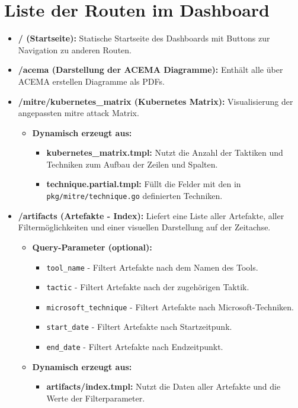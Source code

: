 \chapter{Liste der Routen im Dashboard}
\label{app:routes}
\begin{itemize}
    \item \textbf{/ (Startseite):} Statische Startseite des Dashboards mit Buttons zur Navigation zu anderen Routen.
    \item \textbf{/acema (Darstellung der ACEMA Diagramme):} Enthält alle über ACEMA erstellen Diagramme als PDFs.
    \item \textbf{/mitre/kubernetes\_matrix (Kubernetes Matrix):} Visualisierung der angepassten \gls{mitre} \gls{attack} Matrix.
          \begin{itemize}
              \item \textbf{Dynamisch erzeugt aus:}
                    \begin{itemize}
                        \item \textbf{kubernetes\_matrix.tmpl:} Nutzt die Anzahl der Taktiken und Techniken zum Aufbau der Zeilen und Spalten.
                        \item \textbf{technique.partial.tmpl:} Füllt die Felder mit den in \\
                        \verb|pkg/mitre/technique.go| definierten Techniken.
                    \end{itemize}
          \end{itemize}

    \item \textbf{/artifacts (Artefakte - Index):} Liefert eine Liste aller Artefakte, aller Filtermöglichkeiten und einer visuellen Darstellung auf der Zeitachse.
          \begin{itemize}
              \item \textbf{Query-Parameter (optional):}
                    \begin{itemize}
                        \item \texttt{tool\_name} - Filtert Artefakte nach dem Namen des Tools.
                        \item \texttt{tactic} - Filtert Artefakte nach der zugehörigen Taktik.
                        \item \texttt{microsoft\_technique} - Filtert Artefakte nach Microsoft-Techniken.
                        \item \texttt{start\_date} - Filtert Artefakte nach Startzeitpunk.
                        \item \texttt{end\_date} - Filtert Artefakte nach Endzeitpunkt.
                    \end{itemize}
              \item \textbf{Dynamisch erzeugt aus:}
                    \begin{itemize}
                        \item \textbf{artifacts/index.tmpl:} Nutzt die Daten aller Artefakte und die Werte der Filterparameter.
                    \end{itemize}
          \end{itemize}


\end{itemize}
